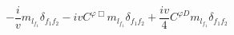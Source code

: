 %
\begin{dmath*}
%
  -  \frac{i}{v} m_{l_{f_1}} \delta_{f_1 f_2}  -  i v C^{ \varphi  \Box} m_{l_{f_1}} \delta_{f_1 f_2}  +  \frac{i v}{4} C^{ \varphi  D} m_{l_{f_1}} \delta_{f_1 f_2}
%
\end{dmath*}
%
